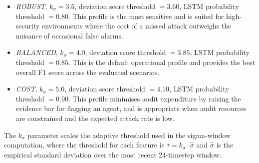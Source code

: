 \begin{itemize}
    \item \textit{ROBUST}, $k_\sigma = 3.5$, deviation score threshold $= 3.60$, LSTM probability threshold $= 0.80$. This profile is the most sensitive and is suited for high-security environments where the cost of a missed attack outweighs the nuisance of occasional false alarms.
    \item \textit{BALANCED}, $k_\sigma = 4.0$, deviation score threshold $= 3.85$, LSTM probability threshold $= 0.85$. This is the default operational profile and provides the best overall F1 score across the evaluated scenarios.
    \item \textit{COST}, $k_\sigma = 5.0$, deviation score threshold $= 4.10$, LSTM probability threshold $= 0.90$. This profile minimises audit expenditure by raising the evidence bar for flagging an agent, and is appropriate when audit resources are constrained and the expected attack rate is low.
\end{itemize}

The $k_\sigma$ parameter scales the adaptive threshold used in the sigma-window computation, where the threshold for each feature is $\tau = k_\sigma \cdot \hat{\sigma}$ and $\hat{\sigma}$ is the empirical standard deviation over the most recent 24-timestep window.

